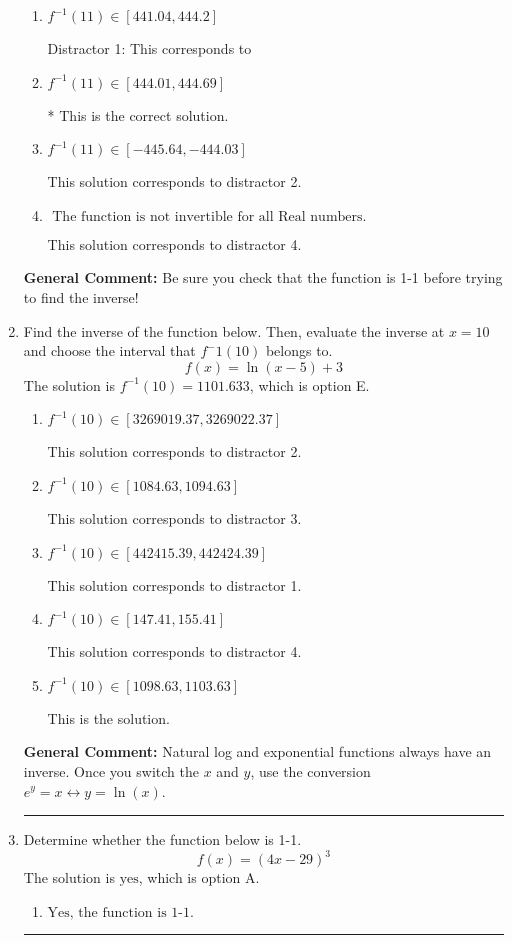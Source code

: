\documentclass{extbook}[14pt]
\newcommand{\litem}[1]{\item #1

\rule{\textwidth}{0.4pt}}
\begin{document}
\begin{enumerate}
{\begin{enumerate}[label=\Alph*.]
 This solution corresponds to distractor 3.
\item \( f^{-1}(11) \in [441.04, 444.2] \)

 Distractor 1: This corresponds to 
\item \( f^{-1}(11) \in [444.01, 444.69] \)

* This is the correct solution.
\item \( f^{-1}(11) \in [-445.64, -444.03] \)

 This solution corresponds to distractor 2.
\item \( \text{ The function is not invertible for all Real numbers. } \)

 This solution corresponds to distractor 4.
\end{enumerate}

\textbf{General Comment:} Be sure you check that the function is 1-1 before trying to find the inverse!
}
\litem{
Find the inverse of the function below. Then, evaluate the inverse at $x = 10$ and choose the interval that $f^-1(10)$ belongs to.
\[ f(x) = \ln{(x-5)}+3 \]The solution is \( f^{-1}(10) = 1101.633 \), which is option E.\begin{enumerate}[label=\Alph*.]
\item \( f^{-1}(10) \in [3269019.37, 3269022.37] \)

 This solution corresponds to distractor 2.
\item \( f^{-1}(10) \in [1084.63, 1094.63] \)

 This solution corresponds to distractor 3.
\item \( f^{-1}(10) \in [442415.39, 442424.39] \)

 This solution corresponds to distractor 1.
\item \( f^{-1}(10) \in [147.41, 155.41] \)

 This solution corresponds to distractor 4.
\item \( f^{-1}(10) \in [1098.63, 1103.63] \)

 This is the solution.
\end{enumerate}

\textbf{General Comment:} Natural log and exponential functions always have an inverse. Once you switch the $x$ and $y$, use the conversion $ e^y = x \leftrightarrow y=\ln(x)$.
}
\litem{
Determine whether the function below is 1-1.
\[ f(x) = (4 x - 29)^3 \]The solution is \( \text{yes} \), which is option A.\begin{enumerate}[label=\Alph*.]
\item \( \text{Yes, the function is 1-1.} \)


\end{enumerate}}
\end{enumerate}
\end{document}

